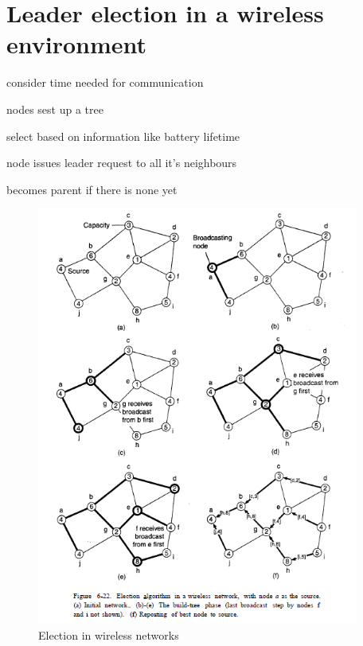 \section{Leader election in a wireless environment}
\begin{compactitem}
\item consider time needed for communication
\item nodes sest up a tree
\item select based on information like battery lifetime
\item node issues leader request to all it's neighbours
\item becomes parent if there is none yet
\end{compactitem}
\begin{figure}[h]
	\centering
	\includegraphics[width=400px]{gfx/Leader_adhoc.png}
	\caption{Election in wireless networks}
	\label{img:Leader_adhoc}
\end{figure}

